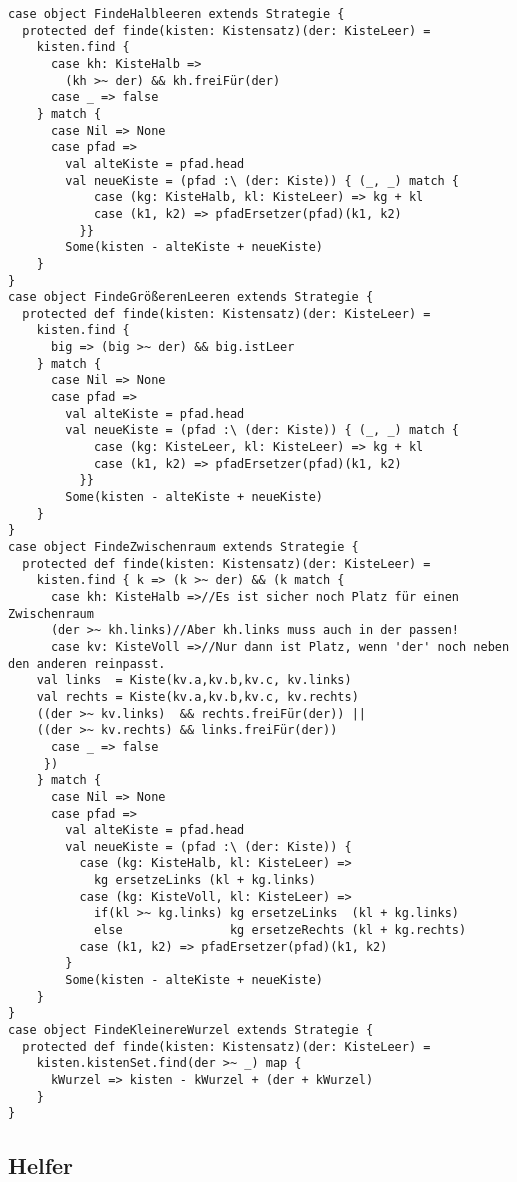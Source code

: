 \begin{lstlisting}
case object FindeHalbleeren extends Strategie {
  protected def finde(kisten: Kistensatz)(der: KisteLeer) =
    kisten.find {
      case kh: KisteHalb =>
        (kh >~ der) && kh.freiFür(der)
      case _ => false
    } match {
      case Nil => None
      case pfad =>
        val alteKiste = pfad.head
        val neueKiste = (pfad :\ (der: Kiste)) { (_, _) match {
            case (kg: KisteHalb, kl: KisteLeer) => kg + kl
            case (k1, k2) => pfadErsetzer(pfad)(k1, k2)
          }}
        Some(kisten - alteKiste + neueKiste)
    }
}
case object FindeGrößerenLeeren extends Strategie {
  protected def finde(kisten: Kistensatz)(der: KisteLeer) =
    kisten.find {
      big => (big >~ der) && big.istLeer
    } match {
      case Nil => None
      case pfad =>
        val alteKiste = pfad.head
        val neueKiste = (pfad :\ (der: Kiste)) { (_, _) match {
            case (kg: KisteLeer, kl: KisteLeer) => kg + kl
            case (k1, k2) => pfadErsetzer(pfad)(k1, k2)
          }}
        Some(kisten - alteKiste + neueKiste)
    }
}
case object FindeZwischenraum extends Strategie {
  protected def finde(kisten: Kistensatz)(der: KisteLeer) =
    kisten.find { k => (k >~ der) && (k match {
      case kh: KisteHalb =>//Es ist sicher noch Platz für einen Zwischenraum
	  (der >~ kh.links)//Aber kh.links muss auch in der passen!
      case kv: KisteVoll =>//Nur dann ist Platz, wenn 'der' noch neben den anderen reinpasst.
	val links  = Kiste(kv.a,kv.b,kv.c, kv.links)
	val rechts = Kiste(kv.a,kv.b,kv.c, kv.rechts)
	((der >~ kv.links)  && rechts.freiFür(der)) ||
	((der >~ kv.rechts) && links.freiFür(der))
      case _ => false
     })
    } match {
      case Nil => None
      case pfad =>
        val alteKiste = pfad.head
        val neueKiste = (pfad :\ (der: Kiste)) {
          case (kg: KisteHalb, kl: KisteLeer) =>
            kg ersetzeLinks (kl + kg.links)
          case (kg: KisteVoll, kl: KisteLeer) =>
            if(kl >~ kg.links) kg ersetzeLinks  (kl + kg.links)
            else               kg ersetzeRechts (kl + kg.rechts)
          case (k1, k2) => pfadErsetzer(pfad)(k1, k2)
        }
        Some(kisten - alteKiste + neueKiste)
    }
}
case object FindeKleinereWurzel extends Strategie {
  protected def finde(kisten: Kistensatz)(der: KisteLeer) =
    kisten.kistenSet.find(der >~ _) map {
      kWurzel => kisten - kWurzel + (der + kWurzel)
    }
}
\end{lstlisting}
\subsection{Helfer}
